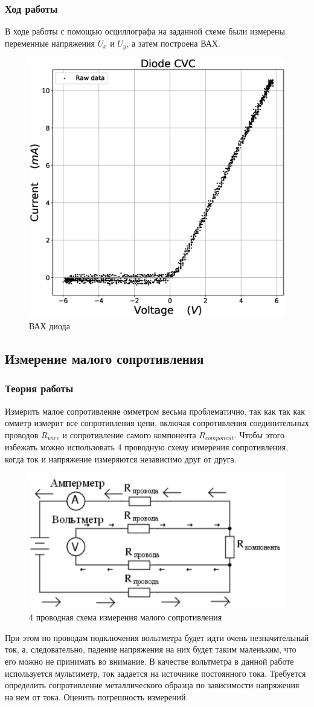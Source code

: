 \documentclass[a4paper,14pt]{extarticle}
\begin{document}
			\subsubsection{Ход работы}
				В ходе работы с помощью осциллографа на заданной схеме были измерены переменные напряжения $U_x$ и $U_y$, а затем построена ВАХ.
					\begin{figure}[h]
						\centering
						\includegraphics[width=.80\linewidth]{Lab1_2.eps}
						\caption{ВАХ диода}
						\label{fig4}
					\end{figure}
				\newpage
		\subsection{Измерение малого сопротивления}
			\subsubsection{Теория работы}
				Измерить малое сопротивление омметром весьма проблематично, так как так как омметр измерит все сопротивления цепи, включая сопротивления соединительных проводов $R_{wire}$ и сопротивление самого компонента $R_{component}$. Чтобы этого избежать можно использовать 4 проводную схему измерения сопротивления, когда ток и напряжение измеряются независимо друг от друга.
				\begin{figure}[h!]
					\centering
					\includegraphics[width=.40\linewidth]{Схема3.png}
					\caption{4 проводная схема измерения малого сопротивления}
					\label{fig5}
				\end{figure}
				\newpage
				При этом по проводам подключения вольтметра будет идти очень
				незначительный ток, а, следовательно, падение напряжения на них будет таким
				маленьким, что его можно не принимать во внимание. В качестве вольтметра в
				данной работе используется мультиметр, ток задается на источнике постоянного
				тока. Требуется определить сопротивление металлического образца по
				зависимости напряжения на нем от тока. Оценить погрешность измерений.
\end{document}
